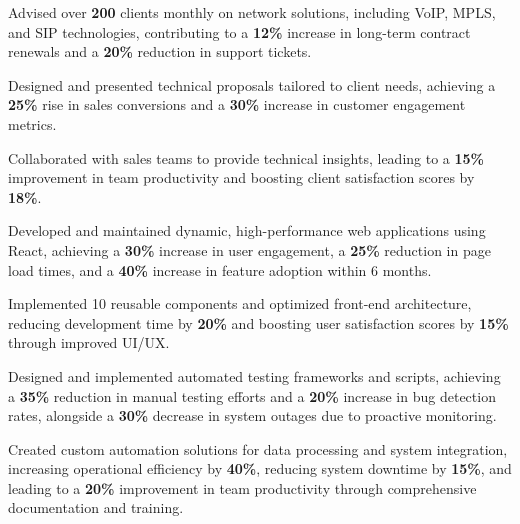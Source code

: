 \documentclass[]{Farhan_Resume_Class}
\begin{document}
\begin{minipage}[t]{0.70\textwidth}
        \begin{tightemize}
            \item Advised over \textbf{200} clients monthly on network solutions, including VoIP,
            MPLS, and SIP technologies, contributing to a \textbf{12\%} increase in
            long-term contract renewals and a \textbf{20\%} reduction in support tickets.
            \item Designed and presented technical proposals tailored to client needs, achieving
            a \textbf{25\%} rise in sales conversions and a \textbf{30\%} increase in
            customer engagement metrics.
            \item Collaborated with sales teams to provide technical insights, leading to a \textbf{15\%}
            improvement in team productivity and boosting client satisfaction scores by
            \textbf{18\%}.
    \end{tightemize}
    \sectionsep

    \begin{tightemize}
        \item Developed and maintained dynamic, high-performance web applications using
        React, achieving a \textbf{30\%} increase in user engagement, a \textbf{25\%}
        reduction in page load times, and a \textbf{40\%} increase in feature adoption
        within 6 months.
        \item Implemented 10 reusable components and optimized front-end architecture,
        reducing development time by \textbf{20\%} and boosting user satisfaction
        scores by \textbf{15\%} through improved UI/UX.
    \end{tightemize}
    \sectionsep

    \begin{tightemize}
        \item Designed and implemented automated testing frameworks and scripts, achieving a
        \textbf{35\%} reduction in manual testing efforts and a \textbf{20\%} increase
        in bug detection rates, alongside a \textbf{30\%} decrease in system outages
        due to proactive monitoring.
        \item Created custom automation solutions for data processing and system integration,
        increasing operational efficiency by \textbf{40\%}, reducing system downtime by
        \textbf{15\%}, and leading to a \textbf{20\%} improvement in team productivity
        through comprehensive documentation and training.
    \end{tightemize}

\end{minipage}
\end{document}

